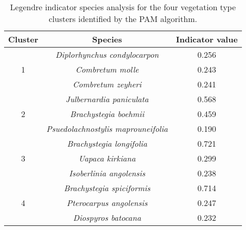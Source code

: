\begin{table}[h]
\centering
\begin{tabular}{ccc}
  \hline
Cluster & Species & Indicator value \\ 
  \hline
\multirow{3}{*}{1} & \textit{Diplorhynchus condylocarpon} & 0.256 \\ 
& \textit{Combretum molle} & 0.243 \\ 
& \textit{Combretum zeyheri} & 0.241 \\ 
   \hline
\multirow{3}{*}{2} & \textit{Julbernardia paniculata} & 0.568 \\ 
& \textit{Brachystegia boehmii} & 0.459 \\ 
& \textit{Psuedolachnostylis maprouneifolia} & 0.190 \\ 
   \hline
\multirow{3}{*}{3} & \textit{Brachystegia longifolia} & 0.721 \\ 
& \textit{Uapaca kirkiana} & 0.299 \\ 
& \textit{Isoberlinia angolensis} & 0.238 \\ 
   \hline
\multirow{3}{*}{4} & \textit{Brachystegia spiciformis} & 0.714 \\ 
& \textit{Pterocarpus angolensis} & 0.247 \\ 
& \textit{Diospyros batocana} & 0.232 \\ 
   \hline
\end{tabular}
\caption{Legendre indicator species analysis for the four vegetation type clusters identified by the PAM algorithm.} 
\label{indval}
\end{table}

